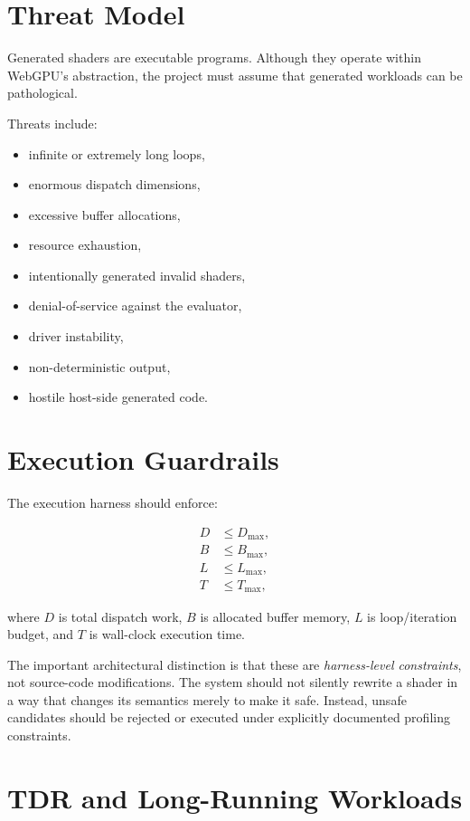 \documentclass[11pt,a4paper,oneside]{report}
\begin{document}
\section{Threat Model}

Generated shaders are executable programs. Although they operate within WebGPU's abstraction,
the project must assume that generated workloads can be pathological.

Threats include:

\begin{itemize}
  \item infinite or extremely long loops,
  \item enormous dispatch dimensions,
  \item excessive buffer allocations,
  \item resource exhaustion,
  \item intentionally generated invalid shaders,
  \item denial-of-service against the evaluator,
  \item driver instability,
  \item non-deterministic output,
  \item hostile host-side generated code.
\end{itemize}

\section{Execution Guardrails}

The execution harness should enforce:

\begin{align}
D &\le D_{\max},\\
B &\le B_{\max},\\
L &\le L_{\max},\\
T &\le T_{\max},
\end{align}

where $D$ is total dispatch work, $B$ is allocated buffer memory, $L$ is loop/iteration budget,
and $T$ is wall-clock execution time.

The important architectural distinction is that these are \emph{harness-level constraints}, not
source-code modifications. The system should not silently rewrite a shader in a way that changes
its semantics merely to make it safe. Instead, unsafe candidates should be rejected or executed
under explicitly documented profiling constraints.

\section{TDR and Long-Running Workloads}
\end{document}
